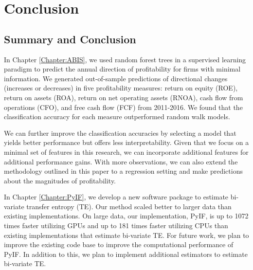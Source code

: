 \chapter{Conclusion}


\section{Summary and Conclusion}



In Chapter \ref{Chapter:ABIS}, we used random forest trees in a supervised learning paradigm to predict the annual direction of profitability for firms with minimal information.  We generated out-of-sample predictions of directional changes (increases or decreases) in five profitability measures: return on equity (ROE), return on assets (ROA), return on net operating assets (RNOA), cash flow from operations (CFO), and free cash flow (FCF) from 2011-2016. We found that the classification accuracy for each measure outperformed  random walk models.

We can further improve the classification accuracies by selecting a model that yields better performance but offers less interpretability.  Given that we focus on a minimal set of features in this research, we can incorporate additional features for additional performance gains. With more observations, we can also extend the methodology outlined in this paper to a regression setting and make predictions about the magnitudes of profitability.

In Chapter \ref{Chapter:PyIF}, we develop a new software package to estimate bi-variate transfer entropy  (TE).  Our method scaled better to larger data than existing implementations.  On large data, our implementation, PyIF, is up to 1072 times faster utilizing GPUs and up to 181 times faster utilizing CPUs than existing implementations that estimate bi-variate TE. For future work, we plan to improve the existing code base to improve the computational performance of PyIF.  In addition to this, we plan to implement additional estimators to estimate bi-variate TE.



